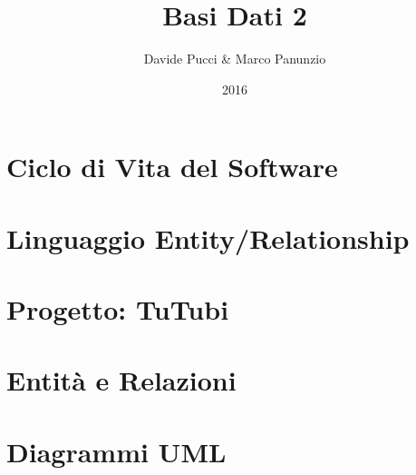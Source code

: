 

\title{Basi Dati 2}
\author{Davide Pucci \& Marco Panunzio}
\date{2016}

\maketitle

\tableofcontents

\chapter{Ciclo di Vita del Software}


\chapter{Linguaggio Entity/Relationship}


\chapter{Progetto: TuTubi}


\chapter{Entità e Relazioni}


\chapter{Diagrammi UML}


